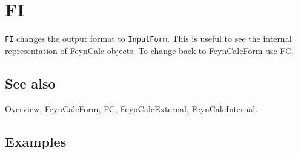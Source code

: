 \documentclass[../FeynCalcManual.tex]{subfiles}
\begin{document}
\hypertarget{fi}{
\section{FI}\label{fi}}

\texttt{FI} changes the output format to \texttt{InputForm}. This is
useful to see the internal representation of FeynCalc objects. To change
back to FeynCalcForm use FC.

\subsection{See also}

\hyperlink{toc}{Overview}, \hyperlink{feyncalcform}{FeynCalcForm},
\hyperlink{fc}{FC}, \hyperlink{feyncalcexternal}{FeynCalcExternal},
\hyperlink{feyncalcinternal}{FeynCalcInternal}.

\subsection{Examples}
\end{document}
